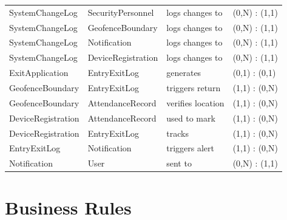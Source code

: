 \documentclass[12pt,a4paper]{article}
\begin{document}
\begin{longtable}{|p{4cm}|p{4cm}|p{3.5cm}|p{2.5cm}|}
SystemChangeLog & SecurityPersonnel & logs changes to & (0,N) : (1,1) \\
SystemChangeLog & GeofenceBoundary & logs changes to & (0,N) : (1,1) \\
SystemChangeLog & Notification & logs changes to & (0,N) : (1,1) \\
SystemChangeLog & DeviceRegistration & logs changes to & (0,N) : (1,1) \\
ExitApplication & EntryExitLog & generates & (0,1) : (0,1) \\
GeofenceBoundary & EntryExitLog & triggers return & (1,1) : (0,N) \\
GeofenceBoundary & AttendanceRecord & verifies location & (1,1) : (0,N) \\
DeviceRegistration & AttendanceRecord & used to mark & (1,1) : (0,N) \\
DeviceRegistration & EntryExitLog & tracks & (1,1) : (0,N) \\
EntryExitLog & Notification & triggers alert & (1,1) : (0,N) \\
Notification & User & sent to & (0,N) : (1,1) \\

\end{longtable}

\vspace{1cm}

\section{Business Rules}
\end{document}
